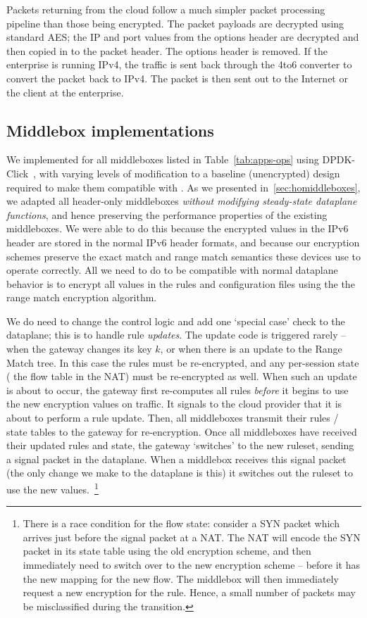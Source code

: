  Packets returning from the cloud follow a much simpler packet processing pipeline than those being encrypted.
The packet payloads are decrypted using standard AES; the IP and port values from the options header are decrypted and then copied in to the packet header. The options header is removed.
If the enterprise is running IPv4, the traffic is sent back through the 4to6 converter to convert the packet back to IPv4.
The packet is then sent out to the Internet or the client at the enterprise.


\subsection{Middlebox implementations}
\label{sec:middleboxes}
We implemented \sys for all middleboxes listed in Table~\ref{tab:apps-ops} using DPDK-Click~\cite{click}, with varying levels of modification to a baseline (unencrypted) design required to make them compatible with \sys. 
As we presented in~\ref{sec:homiddleboxes}, we adapted all header-only middleboxes {\it without modifying steady-state dataplane functions}, and hence preserving the performance properties of the existing middleboxes.
We were able to do this because the encrypted values in the IPv6 header are stored in the normal IPv6 header formats, and because our encryption schemes preserve the exact match and range match semantics these devices use to operate correctly.
All we need to do to be compatible with normal dataplane behavior is to encrypt all values in the rules and configuration files using the the range match encryption algorithm.

We do need to change the control logic and add one `special case' check to the dataplane; this is to handle rule {\it updates}. 
The update code is triggered rarely -- when the gateway changes its key $k$, or when there is an update to the Range Match tree.
In this case the rules must be re-encrypted, and any per-session state (\eg{} the flow table in the NAT) must be re-encrypted as well.
When such an update is about to occur, the gateway first re-computes all rules {\it before} it begins to use the new encryption values on traffic. It signals to the cloud provider that it is about to perform a rule update. Then, all middleboxes transmit their rules / state tables to the gateway for re-encryption. 
Once all middleboxes have received their updated rules and state, the gateway `switches' to the new ruleset, sending a signal packet in the dataplane. When a middlebox receives this signal packet (the only change we make to the dataplane is this) it switches out the ruleset to use the new values.~\footnote{\small There is a race condition for the flow state: consider a SYN packet which arrives just before the signal packet at a NAT. The NAT will encode the SYN packet in its state table using the old encryption scheme, and then immediately need to switch over to the new encryption scheme -- before it has the new mapping for the new flow. The middlebox will then immediately request a new encryption for the rule. Hence, a small number of packets may be misclassified during the transition.}

